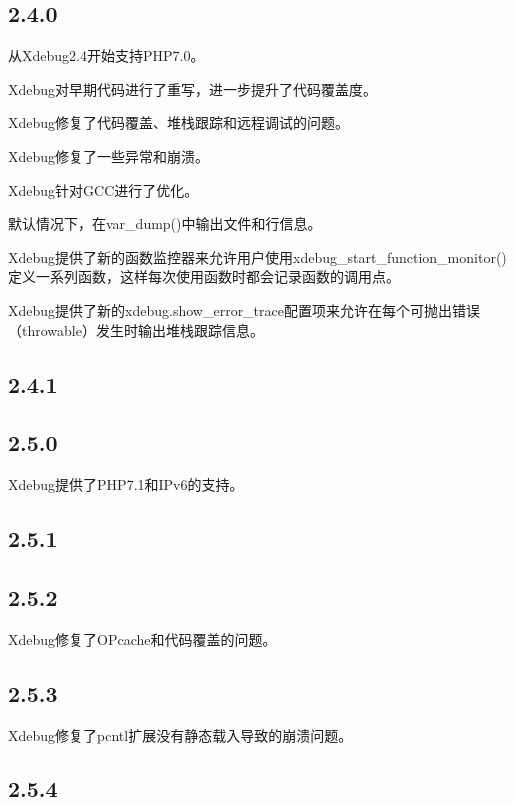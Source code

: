 \subsection{2.4.0}


从Xdebug2.4开始支持PHP7.0。

\begin{compactitem}
\item Xdebug对早期代码进行了重写，进一步提升了代码覆盖度。
\item Xdebug修复了代码覆盖、堆栈跟踪和远程调试的问题。
\item Xdebug修复了一些异常和崩溃。
\item Xdebug针对GCC进行了优化。
\end{compactitem}

默认情况下，在var\_dump()中输出文件和行信息。

Xdebug提供了新的函数监控器来允许用户使用xdebug\_start\_function\_monitor()定义一系列函数，这样每次使用函数时都会记录函数的调用点。

Xdebug提供了新的xdebug.show\_error\_trace配置项来允许在每个可抛出错误（throwable）发生时输出堆栈跟踪信息。


\subsection{2.4.1}

\subsection{2.5.0}

Xdebug提供了PHP7.1和IPv6的支持。

\subsection{2.5.1}


\subsection{2.5.2}


Xdebug修复了OPcache和代码覆盖的问题。

\subsection{2.5.3}


Xdebug修复了pcntl扩展没有静态载入导致的崩溃问题。


\subsection{2.5.4}


